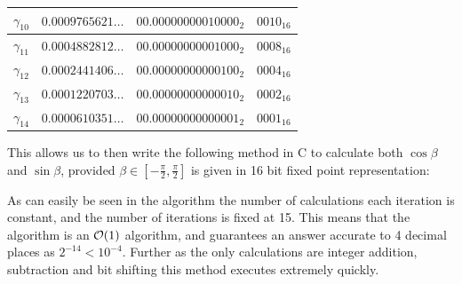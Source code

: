 {\begin{center}
\begin{tabular}{|c|c|c|c|}
	\(\gamma_{10}\) & \(0.0009765621\ldots\)
		& \(\textrm{00.00000000010000}_2\)
		& \(\textrm{0010}_{16}\)\\\hline
	\(\gamma_{11}\) & \(0.0004882812\ldots\)
		& \(\textrm{00.00000000001000}_2\)
		& \(\textrm{0008}_{16}\)\\\hline
	\(\gamma_{12}\) & \(0.0002441406\ldots\)
		& \(\textrm{00.00000000000100}_2\)
		& \(\textrm{0004}_{16}\)\\\hline
	\(\gamma_{13}\) & \(0.0001220703\ldots\)
		& \(\textrm{00.00000000000010}_2\)
		& \(\textrm{0002}_{16}\)\\\hline
	\(\gamma_{14}\) & \(0.0000610351\ldots\)
		& \(\textrm{00.00000000000001}_2\)
		& \(\textrm{0001}_{16}\)\\\hline
\end{tabular}
\end{center}

This allows us to then write the following method in C to calculate both \(\cos\beta\) and \(\sin\beta\), provided \(\beta \in [-\tfrac{\pi}{2}, \tfrac{\pi}{2}]\) is given in 16 bit fixed point representation:


As can easily be seen in the algorithm the number of calculations each iteration is constant, and the number of iterations is fixed at 15. This means that the algorithm is an \(\mathcal{O}(1)\) algorithm, and guarantees an answer accurate to 4 decimal places as \(2^{-14} < 10^{-4}\). Further as the only calculations are integer addition, subtraction and bit shifting this method executes extremely quickly.\\

}
